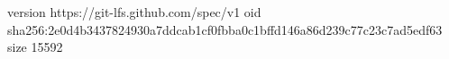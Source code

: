version https://git-lfs.github.com/spec/v1
oid sha256:2e0d4b3437824930a7ddcab1cf0fbba0c1bffd146a86d239c77c23c7ad5edf63
size 15592
